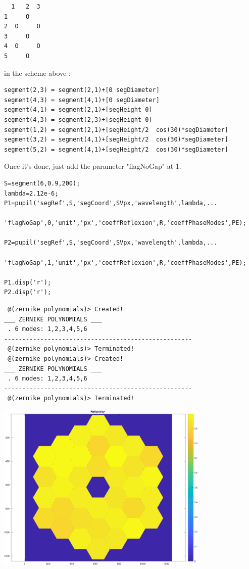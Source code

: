 \documentclass[12pt]{article}
\begin{document}
\begin{verbatim}  1   2  3
1     O
2  O     O
3     O
4  O     O
5     O\end{verbatim}
    \begin{par}
in the scheme above :
\end{par} \vspace{1em}

\begin{verbatim}segment(2,3) = segment(2,1)+[0 segDiameter]
segment(4,3) = segment(4,1)+[0 segDiameter]
segment(4,1) = segment(2,1)+[segHeight 0]
segment(4,3) = segment(2,3)+[segHeight 0]
segment(1,2) = segment(2,1)+[segHeight/2  cos(30)*segDiameter]
segment(3,2) = segment(4,1)+[segHeight/2  cos(30)*segDiameter]
segment(5,2) = segment(4,1)+[segHeight/2  cos(30)*segDiameter]\end{verbatim}
    \begin{par}
Once it's done, just add the parameter "flagNoGap" at 1.
\end{par} \vspace{1em}
\begin{verbatim}
S=segment(6,0.9,200);
lambda=2.12e-6;
P1=pupil('segRef',S,'segCoord',SVpx,'wavelength',lambda,...
    'flagNoGap',0,'unit','px','coeffReflexion',R,'coeffPhaseModes',PE);

P2=pupil('segRef',S,'segCoord',SVpx,'wavelength',lambda,...
    'flagNoGap',1,'unit','px','coeffReflexion',R,'coeffPhaseModes',PE);

P1.disp('r');
P2.disp('r');
\end{verbatim}

        \color{lightgray} \begin{verbatim} @(zernike polynomials)> Created!
___ ZERNIKE POLYNOMIALS ___
 . 6 modes: 1,2,3,4,5,6
----------------------------------------------------
 @(zernike polynomials)> Terminated!
 @(zernike polynomials)> Created!
___ ZERNIKE POLYNOMIALS ___
 . 6 modes: 1,2,3,4,5,6
----------------------------------------------------
 @(zernike polynomials)> Terminated!
\end{verbatim} \color{black}
    
\includegraphics [width=4in]{docuPupilClass_16.pdf}
\end{document}
